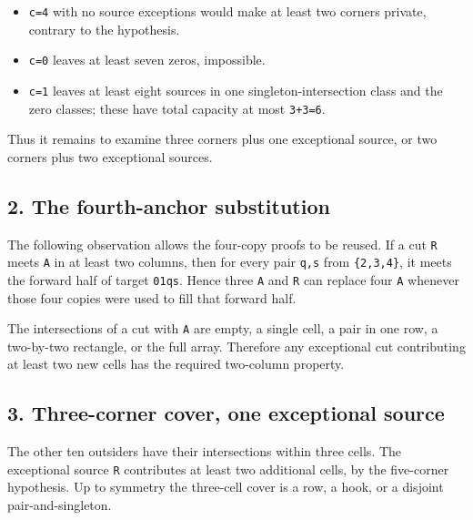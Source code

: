 \documentclass[
  10pt,
]{article}
\providecommand{\tightlist}{%
  \setlength{\itemsep}{0pt}\setlength{\parskip}{0pt}}
\begin{document}
\begin{itemize}
\tightlist
\item
  \texttt{c=4} with no source exceptions would make at least two corners
  private, contrary to the hypothesis.
\item
  \texttt{c=0} leaves at least seven zeros, impossible.
\item
  \texttt{c=1} leaves at least eight sources in one
  singleton-intersection class and the zero classes; these have total
  capacity at most \texttt{3+3=6}.
\end{itemize}

Thus it remains to examine three corners plus one exceptional source, or
two corners plus two exceptional sources.

\hypertarget{the-fourth-anchor-substitution}{%
\subsection*{2. The fourth-anchor
substitution}\label{the-fourth-anchor-substitution}}

The following observation allows the four-copy proofs to be reused. If a
cut \texttt{R} meets \texttt{A} in at least two columns, then for every
pair \texttt{q,s} from \texttt{\{2,3,4\}}, it meets the forward half of
target \texttt{01\textbar{}qs}. Hence three \texttt{A} and \texttt{R}
can replace four \texttt{A} whenever those four copies were used to fill
that forward half.

The intersections of a cut with \texttt{A} are empty, a single cell, a
pair in one row, a two-by-two rectangle, or the full array. Therefore
any exceptional cut contributing at least two new cells has the required
two-column property.

\hypertarget{three-corner-cover-one-exceptional-source}{%
\subsection*{3. Three-corner cover, one exceptional
source}\label{three-corner-cover-one-exceptional-source}}

The other ten outsiders have their intersections within three cells. The
exceptional source \texttt{R} contributes at least two additional cells,
by the five-corner hypothesis. Up to symmetry the three-cell cover is a
row, a hook, or a disjoint pair-and-singleton.
\end{document}
